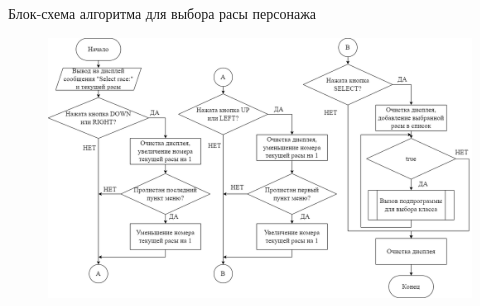 \documentclass[12pt,a4paper,mathserif]{beamer}
\begin{document}
\begin{frame}[fragile]{{\small Блок-схема алгоритма для выбора расы персонажа}}
\begin{figure}
        \centering
        \includegraphics[width=\textwidth]{racePers.png}
        \label{fig:racePers}
    \end{figure}
\end{frame}

\newlength\someheight
\setlength{}
\end{document}
